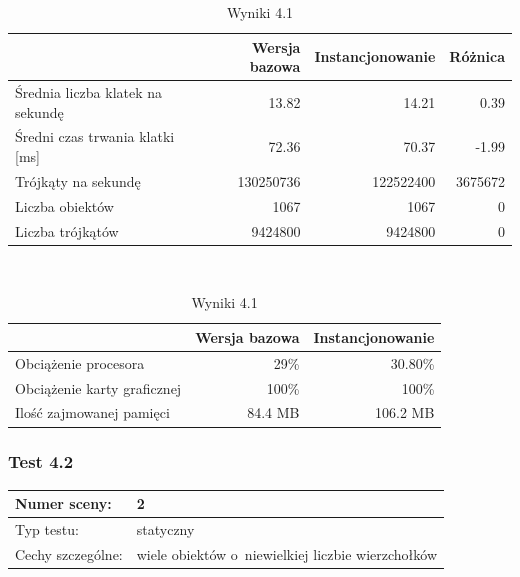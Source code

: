 \documentclass[a4paper,twoside,12pt]{book}
\begin{document}
\begin{table}[H]
    \centering
    \caption{Wyniki 4.1}
    \label{tab:instancing_test1}
    \begin{tabular}{|l||r|r|r|}
        \hline
        & Wersja bazowa & Instancjonowanie & Różnica \\
        \hline
        Średnia liczba klatek na sekundę & 13.82 & 14.21 & 0.39 \\
        \hline
        Średni czas trwania klatki [ms] & 72.36 & 70.37 & -1.99 \\
        \hline
        Trójkąty na sekundę & 130250736 & 122522400 & 3675672 \\
        \hline
        Liczba obiektów & 1067 & 1067 & 0 \\
        \hline
        Liczba trójkątów & 9424800 & 9424800 & 0 \\
        \hline
    \end{tabular} \\
    
    \vspace*{0.5 cm}
    
    \begin{tabular}{|l||r|r|}
         \hline
        & Wersja bazowa & Instancjonowanie \\
         \hline
        Obciążenie procesora & 29\% & 30.80\% \\
        \hline
        Obciążenie karty graficznej & 100\% & 100\% \\
        \hline
        Ilość zajmowanej pamięci & 84.4 MB & 106.2 MB \\
        \hline
    \end{tabular}
\end{table}

\vbox{}

\subsubsection{Test 4.2}
\begin{tabular}{|l||l|}
\hline
Numer sceny: & 2 \\
\hline
Typ testu: & statyczny \\
\hline
Cechy szczególne: & wiele obiektów o~niewielkiej liczbie wierzchołków \\
\hline
\end{tabular}\\

\vbox{}
\end{document}
